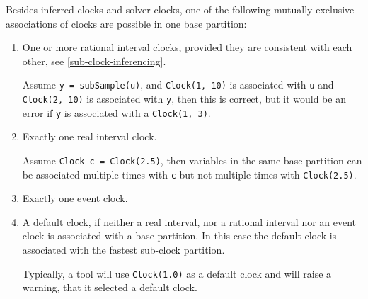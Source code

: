 Besides inferred clocks and solver clocks, one of the following mutually
exclusive associations of clocks are possible in one base partition:
\begin{enumerate}
\item
  One or more rational interval clocks, provided they are consistent with each other, see \cref{sub-clock-inferencing}.
  \begin{example}
  Assume \lstinline!y = subSample(u)!, and \lstinline!Clock(1, 10)! is associated with \lstinline!u! and \lstinline!Clock(2, 10)! is associated with \lstinline!y!, then this is correct, but it would be an error if \lstinline!y! is associated with a \lstinline!Clock(1, 3)!.
  \end{example}
\item
  Exactly one real interval clock.
  \begin{example}
  Assume \lstinline!Clock c = Clock(2.5)!, then variables in the same base partition can be associated multiple times with \lstinline!c! but not multiple times with \lstinline!Clock(2.5)!.
  \end{example}
\item
  Exactly one event clock.
\item
  A default clock, if neither a real interval, nor a rational interval nor an event clock is associated with a base partition.
  In this case the default clock is associated with the fastest sub-clock partition.
  \begin{nonnormative}
  Typically, a tool will use \lstinline!Clock(1.0)! as a default clock and will raise a warning, that it selected a default clock.
  \end{nonnormative}
\end{enumerate}

